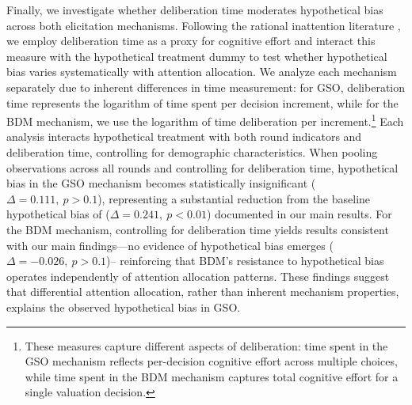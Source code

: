 \documentclass[12pt]{article}
\begin{document}
Finally, we investigate whether deliberation time moderates hypothetical bias across both elicitation mechanisms. Following the rational inattention literature \citep{sims2003implications, alaoui2016endogenous}, we employ deliberation time as a proxy for cognitive effort and interact this measure with the hypothetical treatment dummy to test whether hypothetical bias  varies systematically with attention allocation. We analyze each mechanism separately due to inherent differences in time measurement: for GSO, deliberation time represents the logarithm of time spent per decision increment, while for the BDM mechanism, we use the logarithm of time deliberation per increment.\footnote{These measures capture different aspects of deliberation: time spent in the GSO mechanism reflects per-decision cognitive effort across multiple choices, while  time spent in the BDM mechanism captures total cognitive effort for a single valuation decision.} Each analysis interacts hypothetical treatment with both round indicators and deliberation time, controlling for demographic characteristics. When pooling observations across all rounds and controlling for deliberation time, hypothetical bias in the GSO mechanism becomes statistically insignificant (\(\Delta = 0.111,\ p > 0.1\)), representing a substantial reduction from the baseline hypothetical bias of (\(\Delta = 0.241,\ p < 0.01\)) documented in our main results. For the BDM mechanism, controlling for deliberation time yields results consistent with our main findings—no evidence of hypothetical bias emerges (\(\Delta =-0.026,\ p > 0.1\))-- reinforcing that BDM's resistance to hypothetical bias operates independently of attention allocation patterns. These findings suggest that differential attention allocation, rather than inherent mechanism properties, explains the observed hypothetical bias in GSO. 
\end{document}
